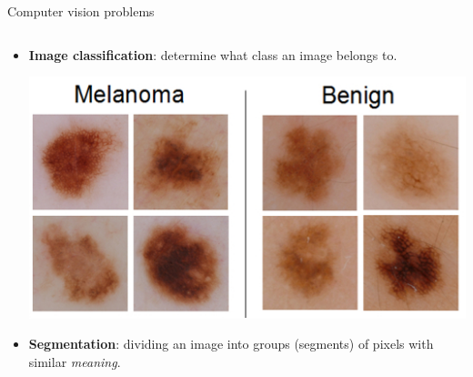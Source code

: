 \documentclass[9pt, aspectratio=169]{beamer}
\begin{document}
\begin{frame}
    {Computer vision problems}
    \begin{columns}[t]
        \begin{column}{.5\textwidth}
            \begin{itemize}
                \item \textbf{Image classification}: determine what class an image belongs to.

                      \centering
                      \includegraphics[width=.6\textwidth]{ISIC_melanoma.jpg}
                      \pause
                \item \raggedright \textbf{Segmentation}: dividing an image into groups (segments) of pixels with similar \textit{meaning}.


\end{itemize}
\end{column}
\end{columns}
\end{frame}
\end{document}
